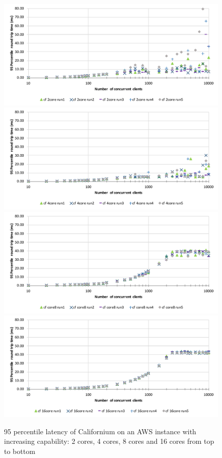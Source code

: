 \begin{figure}[!htbp]
\centering
\includegraphics[scale=0.6]{cf_95p_latency_2cores}
\includegraphics[scale=0.6]{cf_95p_latency_4cores}
\includegraphics[scale=0.6]{cf_95p_latency_8cores}
\includegraphics[scale=0.6]{cf_95p_latency_16cores}
\caption[95 percentile latency of Californium on an AWS instance with increasing capability]{95 percentile latency of Californium on an AWS instance with increasing capability: 2 cores, 4 cores, 8 cores and 16 cores from top to bottom}
\label{fig:cf_95p_latency}
\end{figure}

